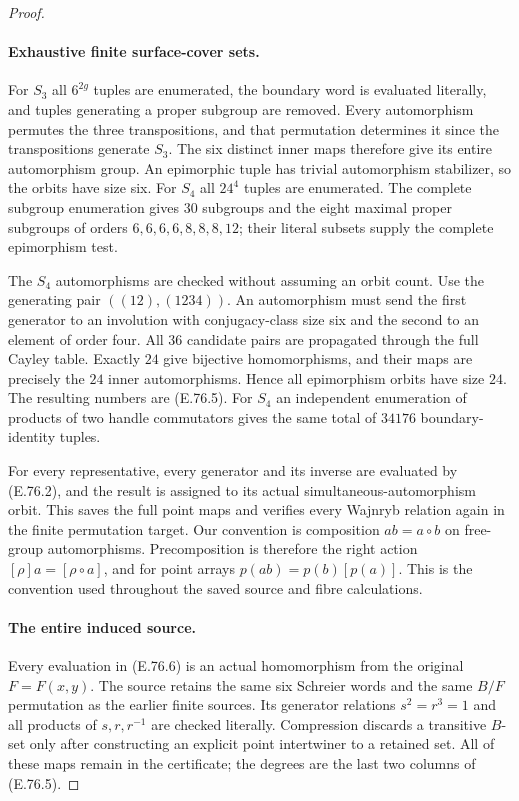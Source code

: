 \begin{proof}
\paragraph{Exhaustive finite surface-cover sets.}
For $S_3$ all $6^{2g}$ tuples are enumerated, the boundary word
is evaluated literally, and tuples generating a proper subgroup
are removed.  Every automorphism permutes the three
transpositions, and that permutation determines it since
the transpositions generate $S_3$.  The six distinct inner
maps therefore give its entire automorphism group.
An epimorphic tuple has trivial
automorphism stabilizer, so the orbits have size six.
For $S_4$ all $24^4$ tuples are enumerated.  The complete
subgroup enumeration gives $30$ subgroups and the eight
maximal proper subgroups of orders
$6,6,6,6,8,8,8,12$; their literal subsets supply the complete
epimorphism test.

The $S_4$ automorphisms are checked without assuming an orbit
count.  Use the generating pair $((12),(1234))$.  An
automorphism must send the first generator to an involution
with conjugacy-class size six and the second to an element
of order four.  All $36$ candidate pairs are propagated
through the full Cayley table.  Exactly $24$ give bijective
homomorphisms, and their maps are precisely the $24$ inner
automorphisms.  Hence all epimorphism orbits have size $24$.
The resulting numbers are (E.76.5).  For $S_4$ an independent
enumeration of products of two handle commutators gives
the same total of $34176$ boundary-identity tuples.

For every representative, every generator and its inverse
are evaluated by (E.76.2), and the result is assigned to its
actual simultaneous-automorphism orbit.  This saves the full
point maps and verifies every Wajnryb relation again in the
finite permutation target.  Our convention is composition
$ab=a\circ b$ on free-group automorphisms.  Precomposition
is therefore the right action $[\rho]a=[\rho\circ a]$,
and for point arrays $p(ab)=p(b)[p(a)]$.  This is the convention
used throughout the saved source and fibre calculations.

\paragraph{The entire induced source.}
Every evaluation in (E.76.6) is an actual homomorphism from
the original $F=F(x,y)$.  The source retains the same six
Schreier words and the same $B/F$ permutation as the earlier
finite sources.  Its generator relations $s^2=r^3=1$ and
all products of $s,r,r^{-1}$ are checked literally.
Compression discards a transitive $B$-set only after constructing
an explicit point intertwiner to a retained set.  All of
these maps remain in the certificate; the degrees are the
last two columns of (E.76.5).


\end{proof}
